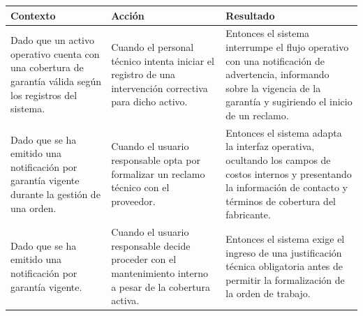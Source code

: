 \footnotesize\begin{longtable}{|p{0.28\textwidth}|p{0.32\textwidth}|p{0.34\textwidth}|}\hline
\textbf{Contexto} & \textbf{Acción} & \textbf{Resultado} \\ \hline
\parbox[t]{\linewidth}{Dado que un activo operativo cuenta con una cobertura de garantía válida según los registros del sistema.} & \parbox[t]{\linewidth}{Cuando el personal técnico intenta iniciar el registro de una intervención correctiva para dicho activo.} & \parbox[t]{\linewidth}{Entonces el sistema interrumpe el flujo operativo con una notificación de advertencia, informando sobre la vigencia de la garantía y sugiriendo el inicio de un reclamo.} \\ \hline
\parbox[t]{\linewidth}{Dado que se ha emitido una notificación por garantía vigente durante la gestión de una orden.} & \parbox[t]{\linewidth}{Cuando el usuario responsable opta por formalizar un reclamo técnico con el proveedor.} & \parbox[t]{\linewidth}{Entonces el sistema adapta la interfaz operativa, ocultando los campos de costos internos y presentando la información de contacto y términos de cobertura del fabricante.} \\ \hline
\parbox[t]{\linewidth}{Dado que se ha emitido una notificación por garantía vigente.} & \parbox[t]{\linewidth}{Cuando el usuario responsable decide proceder con el mantenimiento interno a pesar de la cobertura activa.} & \parbox[t]{\linewidth}{Entonces el sistema exige el ingreso de una justificación técnica obligatoria antes de permitir la formalización de la orden de trabajo.} \\ \hline
\end{longtable}\normalsize
\vspace{1em}